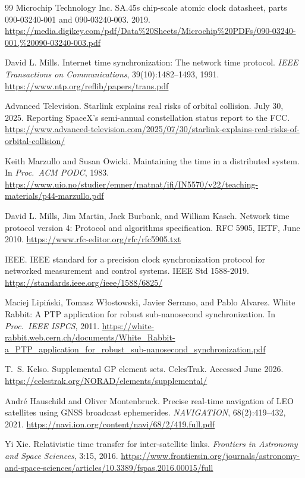 \documentclass[twocolumn,10pt]{article}
\begin{document}
\begin{thebibliography}{99}
Microchip Technology Inc.
SA.45s chip-scale atomic clock datasheet, parts 090-03240-001 and 090-03240-003.
2019.
\url{https://media.digikey.com/pdf/Data\%20Sheets/Microchip\%20PDFs/090-03240-001,\%20090-03240-003.pdf}

David L. Mills.
Internet time synchronization: The network time protocol.
\textit{IEEE Transactions on Communications}, 39(10):1482--1493, 1991.
\url{https://www.ntp.org/reflib/papers/trans.pdf}

Advanced Television.
Starlink explains real risks of orbital collision.
July 30, 2025. Reporting SpaceX's semi-annual constellation status report to the FCC.
\url{https://www.advanced-television.com/2025/07/30/starlink-explains-real-risks-of-orbital-collision/}

Keith Marzullo and Susan Owicki.
Maintaining the time in a distributed system.
In \textit{Proc.\ ACM PODC}, 1983.
\url{https://www.uio.no/studier/emner/matnat/ifi/IN5570/v22/teaching-materials/p44-marzullo.pdf}

David L. Mills, Jim Martin, Jack Burbank, and William Kasch.
Network time protocol version 4: Protocol and algorithms specification.
RFC 5905, IETF, June 2010.
\url{https://www.rfc-editor.org/rfc/rfc5905.txt}

IEEE.
IEEE standard for a precision clock synchronization protocol for networked measurement and control systems.
IEEE Std 1588-2019.
\url{https://standards.ieee.org/ieee/1588/6825/}

Maciej Lipi\'nski, Tomasz W\l{}ostowski, Javier Serrano, and Pablo Alvarez.
White Rabbit: A PTP application for robust sub-nanosecond synchronization.
In \textit{Proc.\ IEEE ISPCS}, 2011.
\url{https://white-rabbit.web.cern.ch/documents/White_Rabbit-a_PTP_application_for_robust_sub-nanosecond_synchronization.pdf}

T.~S. Kelso.
Supplemental GP element sets.
CelesTrak. Accessed June 2026.
\url{https://celestrak.org/NORAD/elements/supplemental/}

Andr\'e Hauschild and Oliver Montenbruck.
Precise real-time navigation of LEO satellites using GNSS broadcast ephemerides.
\textit{NAVIGATION}, 68(2):419--432, 2021.
\url{https://navi.ion.org/content/navi/68/2/419.full.pdf}

Yi Xie.
Relativistic time transfer for inter-satellite links.
\textit{Frontiers in Astronomy and Space Sciences}, 3:15, 2016.
\url{https://www.frontiersin.org/journals/astronomy-and-space-sciences/articles/10.3389/fspas.2016.00015/full}


\end{thebibliography}
\end{document}
